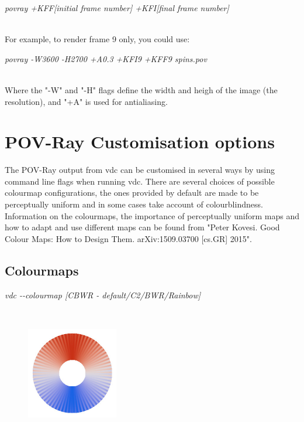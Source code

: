 \begin{minipage}[c]{\textwidth}
\centering
\textit{povray +KFF[initial frame number] +KFI[final frame number]}
\end{minipage}\\

For example, to render frame 9 only, you could use:

\begin{minipage}[c]{\textwidth}
\centering
\textit{povray -W3600 -H2700 +A0.3 +KFI9 +KFF9 spins.pov}
\end{minipage}\\

Where the "-W" and "-H" flags define the width and heigh of the image (the resolution), and "+A" is used for antialiasing. \\

\section*{POV-Ray Customisation options}
The POV-Ray output from vdc can be customised in several ways by using command line flags when running vdc. There are several choices of possible colourmap configurations, the ones provided by default are made to be perceptually uniform and in some cases take account of colourblindness. Information on the colourmaps, the importance of perceptually uniform maps and how to adapt and use different maps can be found from "Peter Kovesi. Good Colour Maps: How to Design Them. arXiv:1509.03700 [cs.GR] 2015". \\

\subsection*{Colourmaps}

\begin{minipage}[c]{\textwidth}
\centering
\textit{vdc -{}-colourmap [CBWR - default/C2/BWR/Rainbow]}
\end{minipage}\\

\begin{figure}[!h]
\center
\includegraphics[width=4cm]{figures/CBWR_colourmap.jpg}
\label{fig:CBWR_colourmap}
\end{figure}

